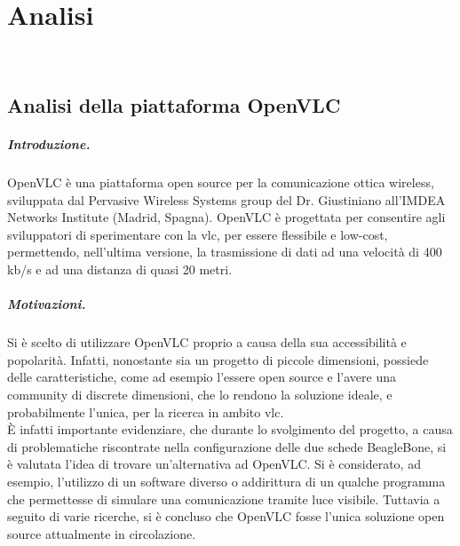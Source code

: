 \chapter{Analisi}
\label{cap:analisi}

\\

\section{Analisi della piattaforma OpenVLC}

\paragraph{Introduzione.}
OpenVLC è una piattaforma open source per la comunicazione ottica wireless, sviluppata dal Pervasive Wireless Systems group del Dr. Giustiniano all'IMDEA Networks Institute (Madrid, Spagna).
OpenVLC è progettata per consentire agli sviluppatori di sperimentare con la \gls{vlc}, per essere flessibile e low-cost, permettendo, nell'ultima versione, la trasmissione di dati ad una velocità di 400 kb/s e ad una distanza di quasi 20 metri.

\paragraph{Motivazioni.}
Si è scelto di utilizzare OpenVLC proprio a causa della sua accessibilità e popolarità. Infatti, nonostante sia un progetto di piccole dimensioni, possiede delle caratteristiche, come ad esempio l'essere open source e l'avere una community di discrete dimensioni, che lo rendono la soluzione ideale, e probabilmente l'unica, per la ricerca in ambito \gls{vlc}.\\
È infatti importante evidenziare, che durante lo svolgimento del progetto, a causa di problematiche riscontrate nella configurazione delle due schede BeagleBone, si è valutata l'idea di trovare un'alternativa ad OpenVLC. Si è considerato, ad esempio, l'utilizzo di un software diverso o addirittura di un qualche programma che permettesse di simulare una comunicazione tramite luce visibile. Tuttavia a seguito di varie ricerche, si è concluso che OpenVLC fosse l'unica soluzione open source attualmente in circolazione.

